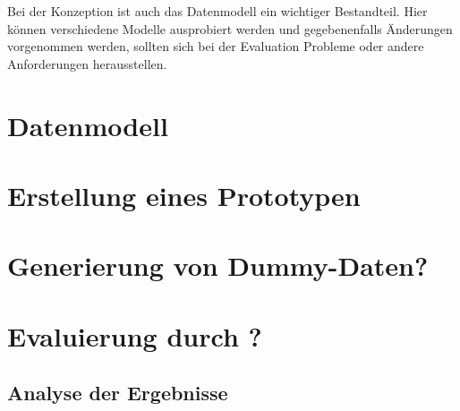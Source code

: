 Bei der Konzeption ist auch das Datenmodell ein wichtiger Bestandteil. Hier können verschiedene Modelle ausprobiert werden und gegebenenfalls Änderungen vorgenommen werden, sollten sich bei der Evaluation Probleme oder andere Anforderungen herausstellen.

\section{Datenmodell}

\section{Erstellung eines Prototypen}

\section{Generierung von Dummy-Daten?}

\section{Evaluierung durch ?}
\subsection{Analyse der Ergebnisse}